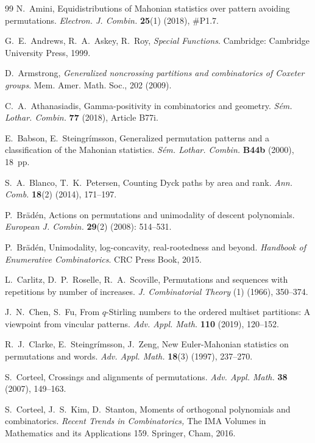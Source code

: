 \documentclass[12pt]{amsart}
\numberwithin{equation}{section}
\theoremstyle{plain}
\theoremstyle{definition}
\begin{document}
\begin{thebibliography}{99}
N.~Amini, Equidistributions of Mahonian statistics over pattern avoiding permutations. {\it Electron. J. Combin.} {\bf 25}(1) (2018), \#P1.7.

G.~E.~Andrews, R.~A.~Askey, R.~Roy, {\it Special Functions}. Cambridge: Cambridge University Press, 1999.

D.~Armstrong, {\it Generalized noncrossing partitions and combinatorics of Coxeter groups}. Mem. Amer. Math. Soc., 202 (2009).

 C.~A.~Athanasiadis, Gamma-positivity in combinatorics and geometry. {\it S\'{e}m. Lothar. Combin.} {\bf 77} (2018), Article B77i.

E.~Babson, E.~Steingr\'{i}msson, Generalized permutation patterns and a classification of the Mahonian statistics. {\it S\'{e}m. Lothar. Combin.} {\bf B44b} (2000), 18~pp.

S.~A.~Blanco, T.~K.~Petersen, Counting Dyck paths by area and rank. {\it Ann. Comb.} {\bf 18}(2) (2014), 171--197.

P.~Br\"ad\'en, Actions on permutations and unimodality of descent polynomials. {\it European J. Combin.} {\bf 29}(2) (2008): 514--531.

P.~Br\"ad\'en, Unimodality, log-concavity, real-rootedness and beyond. {\it Handbook of Enumerative Combinatorics}. CRC Press Book, 2015.

L.~Carlitz, D.~P.~Roselle, R.~A.~Scoville, Permutations and sequences with repetitions by number of increases. {\it J. Combinatorial Theory} (1) (1966), 350--374.

J.~N.~Chen, S.~Fu, From $q$-Stirling numbers to the ordered multiset partitions: A viewpoint from vincular patterns. {\it Adv. Appl. Math.} {\bf 110} (2019), 120--152.

R.~J.~Clarke, E.~Steingr\'{i}msson, J.~Zeng, New Euler-Mahonian statistics on permutations and words. \textit{Adv. Appl. Math.} {\bf 18}(3) (1997), 237--270.

S.~Corteel, Crossings and alignments of permutations. {\it Adv. Appl. Math.} {\bf 38} (2007), 149--163.

S.~Corteel, J.~S.~Kim, D.~Stanton, Moments of orthogonal polynomials and combinatorics. {\it Recent Trends in Combinatorics,} The IMA Volumes in Mathematics and its Applications 159. Springer, Cham, 2016.


\end{thebibliography}
\end{document}
